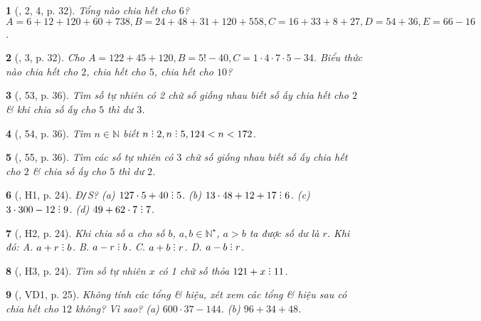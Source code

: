\documentclass{article}
\newtheorem{baitoan}{}
\DeclareRobustCommand{\divby}{%
	\mathrel{\vbox{\baselineskip.65ex\lineskiplimit0pt\hbox{.}\hbox{.}\hbox{.}}}%
}
\begin{document}
\begin{baitoan}[\cite{Trong_Toan_7_2022}, 2, 4, p. 32]
	Tổng nào chia hết cho $6$? $A = 6 + 12 + 120 + 60 + 738,B = 24 + 48 + 31 + 120 + 558,C = 16 + 33 + 8 + 27,D = 54 + 36,E = 66 - 16$.
\end{baitoan}

\begin{baitoan}[\cite{Trong_Toan_7_2022}, 3, p. 32]
	Cho $A = 122 + 45 + 120,B = 5! - 40,C = 1\cdot4\cdot7\cdot5 - 34$. Biểu thức nào chia hết cho $2$, chia hết cho $5$, chia hết cho $10$?
\end{baitoan}

\begin{baitoan}[\cite{Trong_Toan_7_2022}, 53, p. 36]
	Tìm số tự nhiên có 2 chữ số giống nhau biết số ấy chia hết cho $2$ \& khi chia số ấy cho $5$ thì dư $3$.
\end{baitoan}

\begin{baitoan}[\cite{Trong_Toan_7_2022}, 54, p. 36]
	Tìm $n\in\mathbb{N}$ biết $n\divby2,n\divby5,124 < n < 172$.
\end{baitoan}

\begin{baitoan}[\cite{Trong_Toan_7_2022}, 55, p. 36]
	Tìm các số tự nhiên có $3$ chữ số giống nhau biết số ấy chia hết cho $2$ \& chia số ấy cho $5$ thì dư $2$.
\end{baitoan}

\begin{baitoan}[\cite{Binh_boi_duong_Toan_6_tap_1}, H1, p. 24]
	{\rm Đ{\tt/}S? (a) $127\cdot5 + 40\divby5$. (b) $13\cdot48 + 12 + 17\divby6$. (c) $3\cdot300 - 12\divby9$. (d) $49 + 62\cdot7\divby7$.}
\end{baitoan}

\begin{baitoan}[\cite{Binh_boi_duong_Toan_6_tap_1}, H2, p. 24]
	Khi chia số $a$ cho số $b$, $a,b\in\mathbb{N}^\star$, $a > b$ ta được số dư là $r$. Khi đó: {\sf A.} $a + r\divby b$. {\sf B.} $a - r\divby b$. {\sf C.} $a + b\divby r$. {\sf D.} $a - b\divby r$.
\end{baitoan}

\begin{baitoan}[\cite{Binh_boi_duong_Toan_6_tap_1}, H3, p. 24]
	Tìm số tự nhiên $x$ có 1 chữ số thỏa $121 + x\divby11$.
\end{baitoan}

\begin{baitoan}[\cite{Binh_boi_duong_Toan_6_tap_1}, VD1, p. 25]
	Không tính các tổng \& hiệu, xét xem các tổng \& hiệu sau có chia hết cho $12$ không? Vì sao? (a) $600\cdot37 - 144$. (b) $96 + 34 + 48$.
\end{baitoan}
\end{document}
